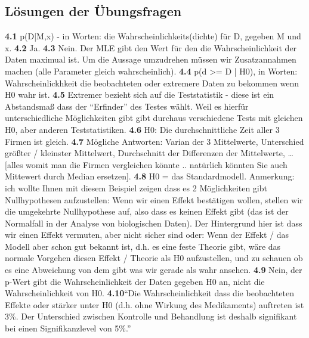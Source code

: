 \documentclass[a4paper,twoside]{tufte-book}\usepackage[]{graphicx}\usepackage[]{color}
\begin{document}




\begin{appendices}

\vspace{1cm}
\begin{fullwidth}

\chapter{Lösungen der Übungsfragen}

\textbf{4.1} p(D|M,x) - in Worten: die Wahrscheinlichkeits(dichte) für D, gegeben M und x.
\textbf{4.2} Ja.
\textbf{4.3} Nein. Der MLE gibt den Wert für den die Wahrscheinlichkeit der Daten maximual ist. Um die Aussage umzudrehen müssen wir Zusatzannahmen machen (alle Parameter gleich wahrscheinlich).
\textbf{4.4} p(d >= D | H0), in Worten: Wahrscheinlickhkeit die beobachteten oder extremere Daten zu bekommen wenn H0 wahr ist.
\textbf{4.5} Extremer bezieht sich auf die Teststatistik - diese ist ein Abstandsmaß dass der “Erfinder” des Testes wählt. Weil es hierfür unterschiedliche Möglichkeiten gibt gibt durchaus verschiedene Tests mit gleichen H0, aber anderen Teststatistiken.
\textbf{4.6} H0: Die durchschnittliche Zeit aller 3 Firmen ist gleich.
\textbf{4.7} Mögliche Antworten: Varian der 3 Mittelwerte, Unterschied größter / kleinster Mittelwert, Durchschnitt der Differenzen der Mittelwerte, … [alles womit man die Firmen vergleichen könnte .. natürlich könnten Sie auch Mittewert durch Median ersetzen].
\textbf{4.8} H0 = das Standardmodell.
Anmerkung: ich wollte Ihnen mit diesem Beispiel zeigen dass es 2 Möglichkeiten gibt Nullhypothesen aufzustellen: Wenn wir einen Effekt bestätigen wollen, stellen wir die umgekehrte Nullhypothese auf, also dass es keinen Effekt gibt (das ist der Normalfall in der Analyse von biologischen Daten). Der Hintergrund hier ist dass wir einen Effekt vermuten, aber nicht sicher sind oder: Wenn der Effekt / das Modell aber schon gut bekannt ist, d.h. es eine feste Theorie gibt, wäre das normale Vorgehen diesen Effekt / Theorie als H0 aufzustellen, und zu schauen ob es eine Abweichung von dem gibt was wir gerade als wahr ansehen.
\textbf{4.9} Nein, der p-Wert gibt die Wahrscheinlichkeit der Daten gegeben H0 an, nicht die Wahrscheinlichkeit von H0.
\textbf{4.10}“Die Wahrscheinlichkeit dass die beobachteten Effekte oder stärker unter H0 (d.h. ohne Wirkung des Medikaments) auftreten ist 3\%. Der Unterschied zwischen Kontrolle und Behandlung ist deshalb signifikant bei einen Signifikanzlevel von 5\%.”

\end{fullwidth}
\end{appendices}
\end{document}

